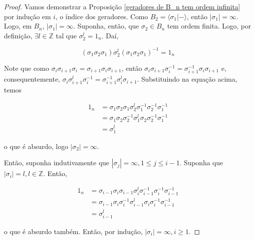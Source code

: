 	\begin{proof}
		Vamos demonstrar a Proposição \eqref{geradores de B_n tem ordem infinita} por indução em $i$, o índice dos geradores.	Como $B_2 = \langle \sigma_1 | - \rangle$, então $|\sigma_1| = \infty$. Logo, em $B_n$, $|\sigma_1| = \infty$. Suponha, então, que $\sigma_2\in B_n$ tem ordem finita. Logo, por definição, $\exists l\in\mathbb{Z}$ tal que $\sigma_2^l = 1_n$. Daí, 
		
		\begin{equation*}
		(\sigma_1\sigma_2\sigma_1)\sigma_2^l(\sigma_1\sigma_2\sigma_1)^{-1} = 1_n
		\end{equation*}
		
		\par\vspace{0.3cm} Note que como $\sigma_i\sigma_{i+1}\sigma_i = \sigma_{i+1}\sigma_i\sigma_{i+1}$, então $\sigma_i\sigma_{i+1}\sigma_i^{-1} = \sigma_{i+1}^{-1}\sigma_i\sigma_{i+1}$ e, consequentemente, $\sigma_i\sigma_{i+1}^l\sigma_i^{-1} = \sigma_{i+1}^{-1}\sigma_i^l\sigma_{i+1}$. Substituindo na equação acima, temos
		
		\begin{align*}
		1_n &= \sigma_1\sigma_2\sigma_1\sigma_2^l\sigma_1^{-1}\sigma_2^{-1}\sigma_1^{-1} \\
		&= \sigma_1\sigma_2\sigma_2^{-1}\sigma_1^l\sigma_2\sigma_2^{-1}\sigma_1^{-1} \\
		&= \sigma_1^l
		\end{align*}
		
		\par\vspace{0.3cm} o que é absurdo, logo $|\sigma_2| = \infty$.
		
		\par\vspace{0.3cm} Então, suponha indutivamente que $|\sigma_j| = \infty, 1\leq j\leq i-1$. Suponha que $|\sigma_i| = l, l\in\mathbb{Z}$. Então, 
		
		\begin{align*}
		1_n &= \sigma_{i-1}\sigma_i\sigma_{i-1}\sigma_i^l\sigma_{i-1}^{-1}\sigma_i^{-1}\sigma_{i-1}^{-1} \\
		&= \sigma_{i-1}\sigma_i\sigma_i^{-1}\sigma_{i-1}^l\sigma_i\sigma_i^{-1}\sigma_{i-1}^{-1} \\
		&= \sigma_{i-1}^l
		\end{align*}
		
		\par\vspace{0.3cm} o que é absurdo também. Então, por indução, $|\sigma_i| = \infty, i\geq 1$. 
	\end{proof}
	
